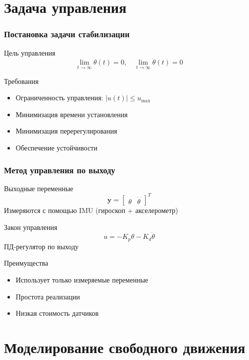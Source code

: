 \documentclass[14pt,aspectratio=169]{beamer}
\begin{document}
\section{Задача управления}

\begin{frame}
\frametitle{Постановка задачи стабилизации}
\begin{block}{Цель управления}
\[
\lim_{t \to \infty} \theta(t) = 0, \quad \lim_{t \to \infty} \dot{\theta}(t) = 0
\]
\end{block}

\begin{block}{Требования}
\begin{itemize}
    \item Ограниченность управления: $|u(t)| \leq u_{\max}$
    \item Минимизация времени установления
    \item Минимизация перерегулирования
    \item Обеспечение устойчивости
\end{itemize}
\end{block}
\end{frame}

\begin{frame}
\frametitle{Метод управления по выходу}
\begin{block}{Выходные переменные}
\[
\mathbf{y} = \begin{bmatrix} \theta & \dot{\theta} \end{bmatrix}^T
\]
Измеряются с помощью IMU (гироскоп + акселерометр)
\end{block}

\begin{block}{Закон управления}
\[
u = -K_p \theta - K_d \dot{\theta}
\]
ПД-регулятор по выходу
\end{block}

\begin{block}{Преимущества}
\begin{itemize}
    \item Использует только измеряемые переменные
    \item Простота реализации
    \item Низкая стоимость датчиков
\end{itemize}
\end{block}
\end{frame}

\section{Моделирование свободного движения}
\end{document}
